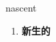 
\begin{frame}
{\huge nascent}
\begin{center}
\begin{enumerate}\Large
  \item \textbf{新生的}
\end{enumerate}
\end{center}
\end{frame}
